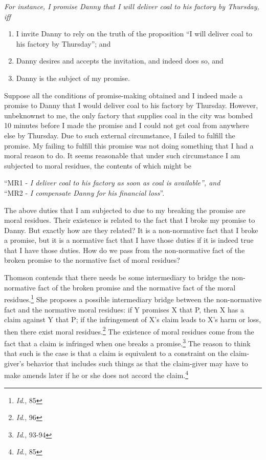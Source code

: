 \begin{displayquote} \def\labelenumi{(\arabic{enumi})}
\itshape For instance, I promise Danny that I will deliver coal to his
factory by Thursday, iff
	\begin{enumerate}
		\item I invite Danny to rely on the truth of the proposition ``I
will deliver coal to his factory by Thursday''; and
		\item Danny desires and accepts the invitation, and indeed does so,
and
		\item  Danny is the subject of my promise.
	\end{enumerate}
\end{displayquote}
\noindent Suppose all the conditions of promise-making obtained and I indeed made
a promise to Danny that I would deliver coal to his factory by Thursday.
However, unbeknownst to me, the only factory that supplies coal in the
city was bombed 10 minutes before I made the promise and I could not get
coal from anywhere else by Thursday. Due to such external circumstance,
I failed to fulfill the promise. My failing to fulfill this promise was
not doing something that I had a moral reason to do. It seems reasonable
that under such circumstance I am subjected to moral residues, the
contents of which might be

\begin{displayquote} \def\labelenumi{(\arabic{enumi})}
	``{\scshape MR1} - \textit{I deliver coal to his factory as soon as coal is
available'', and} \\
	
	``{\scshape MR2} - \textit{I compensate Danny for his financial loss}''.
\end{displayquote}

\noindent The above duties that I am subjected to due to my breaking the promise
are moral residues. Their existence is related to the fact that I broke
my promise to Danny. But exactly how are they related? It is a
non-normative fact that I broke a promise, but it is a normative fact
that I have those duties if it is indeed true that I have those duties.
How do we pass from the non-normative fact of the broken promise to the
normative fact of moral residues?

Thomson contends that there needs be some intermediary to bridge the
non-normative fact of the broken promise and the normative fact of the
moral residues.\footnote{\emph{Id}., 85} She proposes a possible
intermediary bridge between the non-normative fact and the normative
moral residues: if Y promises X that P, then X has a claim against Y
that P; if the infringement of X's claim leads to X's harm or loss, then
there exist moral residues.\footnote{\emph{Id}., 96} The existence of
moral residues come from the fact that a claim is infringed when one
breaks a promise.\footnote{\emph{Id}., 93-94} The reason to think that
such is the case is that a claim is equivalent to a constraint on the
claim-giver's behavior that includes such things as that the claim-giver
may have to make amends later if he or she does not accord the
claim.\footnote{\emph{Id}., 85}

